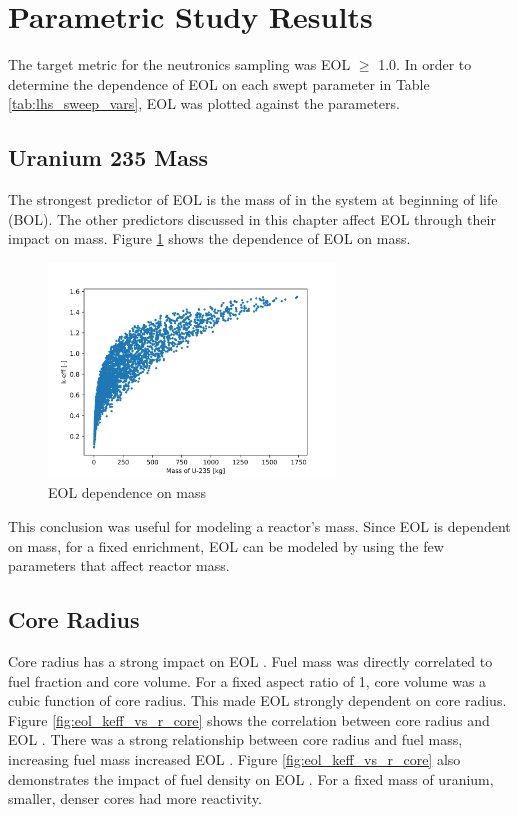 \section{Parametric Study Results}
The target metric for the neutronics sampling was EOL \keff $\geq$ 1.0. In
order to determine the dependence of EOL \keff on each swept parameter in Table
\ref{tab:lhs_sweep_vars}, EOL \keff was plotted against the parameters.

\subsection{Uranium 235 Mass}
The strongest predictor of EOL \keff is the mass of \uran
in the system at beginning of life (BOL). The other predictors discussed 
in this chapter affect EOL \keff
through their impact on \uran mass. Figure \ref{fig:eol_keff_vs_235_mass} 
shows the dependence of EOL \keff on \uran mass.

\begin{figure}[h]
    \centering
    \includegraphics[width=3in]{../images/keff_vs_mass_235.png}
\caption{EOL \keff dependence on \uran mass}
\label{fig:eol_keff_vs_235_mass}
\end{figure}

This conclusion was useful for modeling a reactor's mass. Since EOL \keff is
dependent on \uran mass, for a fixed enrichment, EOL \keff can be modeled by
using the few parameters that affect reactor mass.

\subsection{Core Radius}
Core radius has a strong impact on EOL \keff. Fuel mass was directly correlated
to fuel fraction and core volume. For a fixed aspect ratio of 1, core volume was
a cubic function of core radius. This made EOL \keff strongly dependent on core
radius. Figure \ref{fig:eol_keff_vs_r_core} shows the correlation between 
core radius and EOL \keff. There was a strong relationship between core radius
and fuel mass, increasing fuel mass increased EOL \keff. Figure
\ref{fig:eol_keff_vs_r_core} also demonstrates the impact of fuel density on EOL
\keff. For a fixed mass of uranium, smaller, denser cores had more reactivity.

